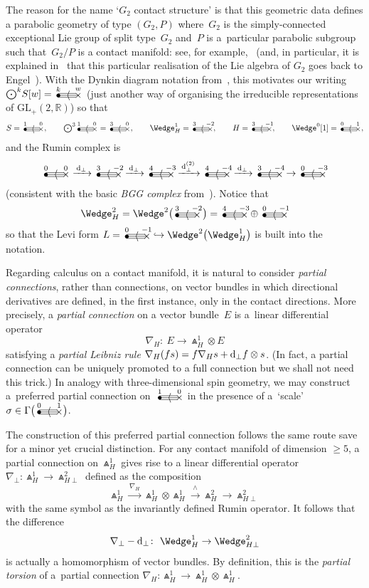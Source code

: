 \documentclass[10pt,a4paper]{amsart}
\numberwithin{equation}{section}
\newcommand{\gtwo}[2]{\begin{picture}(28,10)
\put(4,1.1){\makebox(0,0){$\bullet$}}
\put(24,1.5){\makebox(0,0){$\times$}}
\put(4,3.5){\line(1,0){18}}
\put(4,1.5){\line(1,0){20}}
\put(4,-.5){\line(1,0){18}}
\put(14,1.5){\makebox(0,0){$\langle$}}
\put(4,8){\makebox(0,0){$\scriptstyle #1$}}
\put(24,8){\makebox(0,0){$\scriptstyle #2$}}
\end{picture}}
\begin{document}
The reason for the name `$G_2$ contact structure' is that this geometric data
defines a parabolic geometry of type $(G_2,P)$ where~$G_2$ is the
simply-connected exceptional Lie group of split type~$G_2$ and~$P$ is a~particular parabolic subgroup such that~$G_2/P$ is a contact manifold: see, for
example,~\cite[Section~4.2.8]{CS} (and, in particular, it is explained in~\cite{EN1}
that this particular realisation of the Lie algebra of $G_2$ goes back to
Engel~\cite{E}). With the Dynkin diagram notation from~\cite{BE}, this
motivates our writing $\bigodot^k\!S[w]=\gtwo{k}{w}$ (just another way of
organising the irreducible representations of
${\mathrm{GL}}_+(2,{\mathbb{R}})$) so that
\begin{gather*} \textstyle S=\gtwo{1}{0},\qquad \bigodot^3\!\gtwo{1}{0}=\gtwo{3}{0},\qquad
\Wedge_H^1=\gtwo{3}{-2},\qquad H=\gtwo{3}{-1},\qquad\Wedge^0[1]=\gtwo{0}{1},
\end{gather*}
and the Rumin complex is
\[\gtwo{0}{0}\xrightarrow{\,{\rm d}_\perp\,}\gtwo{3}{-2}
\xrightarrow{\,{\rm d}_\perp\,}\gtwo{4}{-3}
\xrightarrow{\,{\rm d}_\perp^{(2)}\,}\gtwo{4}{-4}
\xrightarrow{\,{\rm d}_\perp\,}\gtwo{3}{-4}\to
\gtwo{0}{-3}\]
(consistent with the basic {\em BGG complex} from~\cite{BE}). Notice that
\[\Wedge_H^2=\Wedge^2\big(\gtwo{3}{-2}\,\big)
=\gtwo{4}{-3}\oplus\gtwo{0}{-1}\]
so that the Levi form $L=\gtwo{0}{-1}\hookrightarrow\Wedge^2\big({\Wedge}_H^1\big)$ is
built into the notation.

Regarding calculus on a contact manifold, it is natural to consider
{\em partial connections}, rather than connections, on vector bundles in which
directional derivatives are defined, in the first instance, only in the contact
directions. More precisely, a {\em partial connection} on a vector bundle~$E$
is a~linear differential operator
\[\nabla_H\colon \ E\to\Wedge_H^1\otimes E\]
satisfying a {\em partial Leibniz rule} $\nabla_H(fs)=f\nabla_Hs+{\rm d}_\perp
f\otimes s$. (In fact, a partial connection can be uniquely promoted
\cite[Proposition~3.5]{EG} to a full connection but we shall not need this
trick.) In analogy with three-dimensional spin geometry, we may construct a~preferred partial connection on~$\gtwo{1}{0}$ in the presence of a~`scale'
$\sigma\in\Gamma\big(\gtwo{0}{1}\big)$.

The construction of this preferred partial connection follows the same route
save for a minor yet crucial distinction. For any contact manifold of dimension
$\geq 5$, a partial connection on $\Wedge_H^1$ gives rise to a linear
differential operator $\nabla_\perp\colon \Wedge_H^1\to\Wedge_{H\perp}^2$ defined as
the composition
\[\Wedge_H^1\xrightarrow{\,\nabla_H\,}
\Wedge_H^1\otimes\Wedge_H^1\xrightarrow{\,\wedge\,}
\Wedge_H^2\to\Wedge_{H\perp}^2\]
with the same symbol as the invariantly defined Rumin operator. It follows
that the difference
\[\nabla_\perp-{\rm d}_\perp\colon \ \Wedge_H^1\to\Wedge_{H\perp}^2\]
is actually a homomorphism of vector bundles. By definition, this is the
{\em partial torsion} of a~partial connection
$\nabla_H\colon \Wedge_H^1\to\Wedge_H^1\otimes\Wedge_H^1$.
\end{document}
